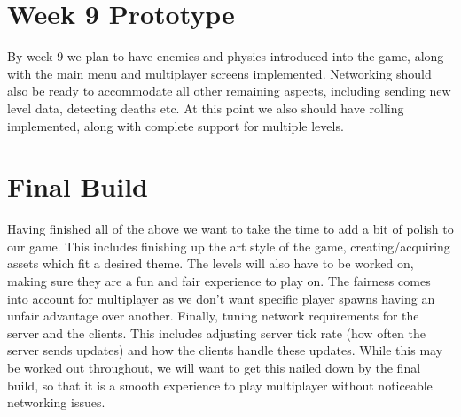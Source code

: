 \documentclass{scrreprt}
\begin{document}
\section{Week 9 Prototype}
By week 9 we plan to have enemies and physics introduced into the game, along with the main menu and multiplayer screens implemented. Networking should also be ready to accommodate all other remaining aspects, including sending new level data, detecting deaths etc. At this point we also should have rolling implemented, along with complete support for multiple levels. 

\section{Final Build}
Having finished all of the above we want to take the time to add a bit of polish to our game. This includes finishing up the art style of the game, creating/acquiring assets which fit a desired theme. The levels will also have to be worked on, making sure they are a fun and fair experience to play on. The fairness comes into account for multiplayer as we don't want specific player spawns having an unfair advantage over another. Finally, tuning network requirements for the server and the clients. This includes adjusting server tick rate (how often the server sends updates) and how the clients handle these updates. While this may be worked out throughout, we will want to get this nailed down by the final build, so that it is a smooth experience to play multiplayer without noticeable networking issues.
\end{document}
